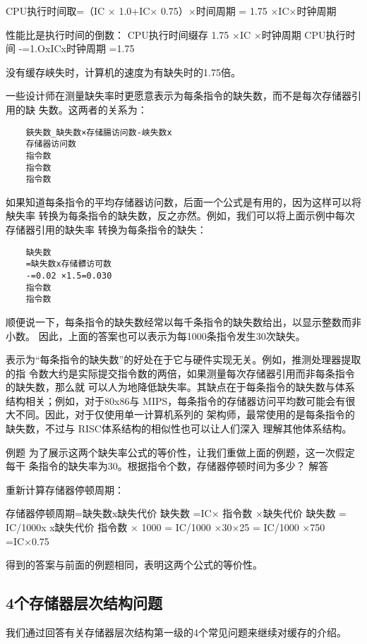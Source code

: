 CPU执行时间取=（IC × 1.0+IC× 0.75）×时间周期
= 1.75 ×IC×时钟周期

性能比是执行时间的倒数：
CPU执行时间缀存
1.75 ×IC ×时钟周期
CPU执行时间
-=1.OxICx时钟周期
=1.75

没有缓存峡失时，计算机的速度为有缺失时的1.75倍。

一些设计师在测量缺失率时更愿意表示为每条指令的缺失数，而不是每次存储器引用的缺
失数。这两者的关系为：

\begin{verbatim}
    鋏失数_缺失数×存储腸访问数-峡失数x
    存储器访问数
    指令数
    指令数
    指令数
\end{verbatim}

如果知道每条指令的平均存储器访问数，后面一个公式是有用的，因为这样可以将觖失率
转换为每条指令的缺失数，反之亦然。例如，我们可以将上面示例中每次存储器引用的缺失率
转换为每条指令的缺失：

\begin{verbatim}
    缺失数
    =缺失数x存储髒访可数
    -=0.02 ×1.5=0.030
    指令数
    指令数
\end{verbatim}

顺便说一下，每条指令的缺失数经常以每千条指令的缺失数给出，以显示整数而非小数。
因此，上面的答案也可以表示为每1000条指令发生30次缺失。

表示为“每条指令的缺失数”的好处在于它与硬件实现无关。例如，推测处理器提取的指
令数大约是实际提交指令数的两倍，如果测量每次存储器引用而非每条指令的缺失数，那么就
可以人为地降低缺失率。其缺点在于每条指令的缺失数与体系结构相关；例如，对于80x86与
MIPS，每条指令的存储器访问平均数可能会有很大不同。因此，对于仅使用单一计算机系列的
架构师，最常使用的是每条指令的缺失数，不过与 RISC体系结构的相似性也可以让人们深入
理解其他体系结构。

例题
为了展示这两个缺失率公式的等价性，让我们重做上面的例题，这一次假定每干
条指令的缺失率为30。根据指令个数，存储器停顿时间为多少？
解答

重新计算存储器停顿周期：

存储器停顿周期=缺失数x缺失代价
缺失数
=IC×
指令数 ×缺失代价
缺失数
= IC/1000x
x缺失代价
指令数 × 1000
= IC/1000 ×30×25
= IC/1000 ×750
=IC×0.75

得到的答案与前面的例题相同，表明这两个公式的等价性。

\subsection{4个存储器层次结构问题}
我们通过回答有关存储器层次结构第一级的4个常见问题来继续对缓存的介绍。

